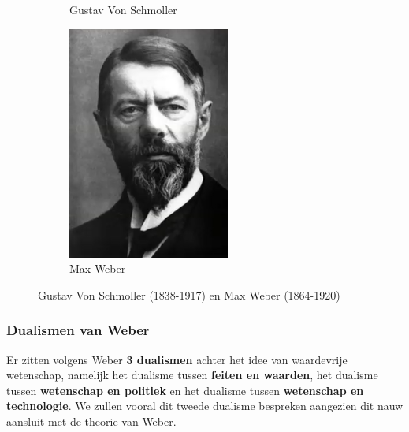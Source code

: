\documentclass[../summary.tex]{subfiles}
\begin{document}
\begin{figure} [htbp]
\begin{subfigure}{0.3\linewidth}
			\caption{Gustav Von Schmoller}
			\label{fig:von-schmoller}
		\end{subfigure}
		\begin{subfigure}{0.3\linewidth}
			\centering
			\includegraphics[width=\linewidth]{images/2-weber.png}
			\caption{Max Weber}
			\label{fig:weber}
		\end{subfigure}
			\caption{Gustav Von Schmoller (1838-1917) en Max Weber (1864-1920)}
		\label{fig:von-schmoller-weber}
	\end{figure}
	
	\subsubsection{Dualismen van Weber}
	
	Er zitten volgens Weber \textbf{3 dualismen} achter het idee van waardevrije wetenschap, namelijk het dualisme tussen \textbf{feiten en waarden}, het dualisme tussen \textbf{wetenschap en politiek} en het dualisme tussen \textbf{wetenschap en technologie}. We zullen vooral dit tweede dualisme bespreken aangezien dit nauw aansluit met de theorie van Weber.
	
\end{document}
